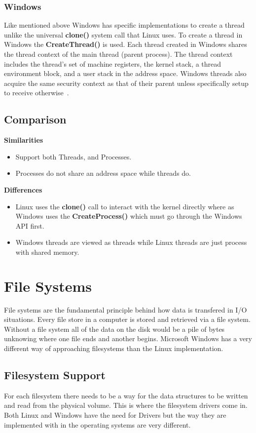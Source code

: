 \documentclass[letterpaper,10pt,notitlepage,fleqn]{article}
\begin{document}
\subsubsection*{Windows}
Like mentioned above Windows has specific implementations to create a thread unlike 
the universal \textbf{clone()} system call that Linux uses. To create a thread in 
Windows the \textbf{CreateThread()} is used. Each thread created in Windows shares 
the thread context of the main thread (parent process). The thread context includes 
the thread's set of machine registers, the kernel stack, a thread environment block, 
and a user stack in the address space. Windows threads also acquire the same security 
context as that of their parent unless specifically setup to receive otherwise~\cite{WI16}. 

\subsection*{Comparison}
\noindent \textbf{Similarities}
\begin{itemize}
    \item Support both Threads, and Processes.
    \item Processes do not share an address space while threads do.
\end{itemize}
\noindent \textbf{Differences}
\begin{itemize}
    \item Linux uses the \textbf{clone()} call to interact with the kernel directly 
    where as Windows uses the \textbf{CreateProcess()} which must go through the 
    Windows API first.
    \item Windows threads are viewed as threads while Linux threads are just process
    with shared memory.
\end{itemize}

\section{File Systems}
File systems are the fundamental principle behind how data is transfered in I/O situations. 
Every file store in a computer is stored and retrieved via a file system. Without 
a file system all of the data on the disk would be a pile of bytes unknowing where one 
file ends and another begins. Microsoft Windows has a very different way of approaching 
filesystems than the Linux implementation.

\subsection{Filesystem Support}
For each filesystem there needs to be a way for the data structures to be written 
and read from the physical volume. This is where the filesystem drivers come 
in. Both Linux and Windows have the need for Drivers but the way they are implemented 
with in the operating systems are very different.
\end{document}
